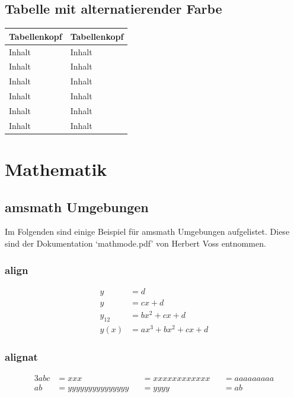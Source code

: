 %
\subsection{Tabelle mit alternatierender Farbe}


\begin{table}[H]
   \tablestyle
   \begin{tabular}{*{2}{v{0.45\textwidth}}}
   \hline
Tabellenkopf &
Tabellenkopf \tabularnewline
\hline
%
 Inhalt  & Inhalt \tabularnewline
 Inhalt  & Inhalt \tabularnewline
 Inhalt  & Inhalt \tabularnewline
 Inhalt  & Inhalt \tabularnewline
 Inhalt  & Inhalt \tabularnewline
 Inhalt  & Inhalt \tabularnewline
\hline
   \end{tabular}
\end{table}
%



\section{Mathematik}

\subsection{amsmath Umgebungen}

Im Folgenden sind einige Beispiel für amsmath Umgebungen aufgelistet. Diese 
sind der Dokumentation `mathmode.pdf' von Herbert Voss entnommen.

\subsubsection{align}
\begin{align}
y      & = d\\
y      & = cx + d\\
y_{12} & = bx^{2} + cx + d\\
y(x)   & = ax^{3} + bx^{2}+ cx + d
\end{align}

\subsubsection{alignat}
\begin{alignat}{3}
abc   &= xxx &&= xxxxxxxxxxxx &&= aaaaaaaaa \\
ab    &= yyyyyyyyyyyyyyy &&= yyyy &&= ab
\end{alignat}

